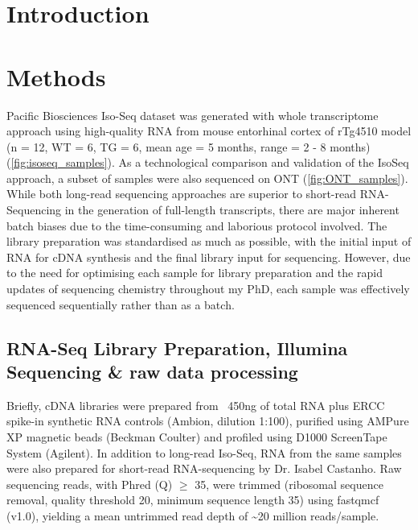 \section{Introduction}

 


\newpage
\section{Methods}
Pacific Biosciences Iso-Seq dataset was generated with whole transcriptome approach using high-quality RNA from mouse entorhinal cortex of rTg4510 model (n = 12, WT = 6, TG = 6, mean age = 5 months, range = 2 - 8 months) (\cref{fig:isoseq_samples}). As a technological comparison and validation of the IsoSeq approach, a subset of samples were also sequenced on ONT (\cref{fig:ONT_samples}). While both long-read sequencing approaches are superior to short-read RNA-Sequencing in the generation of full-length transcripts, there are major inherent batch biases due to the time-consuming and laborious protocol involved. The library preparation was standardised as much as possible, with the initial input of RNA for cDNA synthesis and the final library input for sequencing. However, due to the need for optimising each sample for library preparation and the rapid updates of sequencing chemistry throughout my PhD, each sample was effectively sequenced sequentially rather than as a batch. 

\subsection{RNA-Seq Library Preparation, Illumina Sequencing \& raw data processing}
\label{section: ch2_rna_extraction}
Briefly, cDNA libraries were prepared from ~450ng of total RNA plus ERCC spike-in synthetic RNA controls (Ambion, dilution 1:100), purified using AMPure XP magnetic beads (Beckman Coulter) and profiled using D1000 ScreenTape System (Agilent). 
In addition to long-read Iso-Seq, RNA from the same samples were also prepared for short-read RNA-sequencing by Dr. Isabel Castanho\cite{Castanho2020}. Raw sequencing reads, with Phred (Q) $\geq$ 35, were trimmed (ribosomal sequence removal, quality threshold 20, minimum sequence length 35) using fastqmcf (v1.0), yielding a mean untrimmed read depth of \textasciitilde{}20 million reads/sample. 
 

